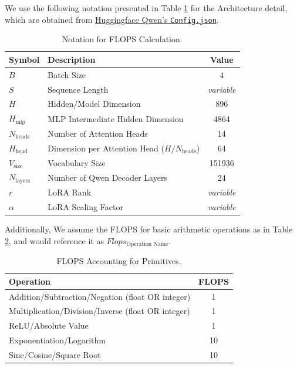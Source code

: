 \documentclass{article}
\begin{document}
We use the following notation presented in Table \ref{tab:notation} for the Architecture detail, which are obtained from \href{https://huggingface.co/Qwen/Qwen2.5-0.5B-Instruct/blob/main/config.json}{Huggingface Qwen's \texttt{Config.json}}.

\begin{table}[!ht]
\renewcommand{\arraystretch}{1.3}
\centering
\setlength{\tabcolsep}{8pt}
\begin{tabular}{llc} 
    \toprule
    \textbf{Symbol} & \textbf{Description} & \textbf{Value} \\
    \midrule
    $B$           & Batch Size & 4 \\ 
    $S$           & Sequence Length & \textit{variable} \\ 
    $H$           & Hidden/Model Dimension & 896 \\
    $H_{\text{mlp}}$ & MLP Intermediate Hidden Dimension & 4864 \\
    $N_{\text{heads}}$ & Number of Attention Heads & 14 \\
    $H_{\text{head}}$ & Dimension per Attention Head ($H / N_{\text{heads}}$) & 64 \\ 
    $V_{\text{size}}$ & Vocabulary Size & 151936 \\
    $N_{\text{layers}}$ & Number of Qwen Decoder Layers & 24 \\ %
    $r$           & LoRA Rank & \textit{variable} \\ %
    $\alpha$      & LoRA Scaling Factor & \textit{variable} \\ %
    \bottomrule
\end{tabular}
\caption{Notation for FLOPS Calculation.} 
\label{tab:notation} 
\end{table}
Additionally, We assume the FLOPS for basic arithmetic operations as in Table \ref{tab:primitive_flops}, and would reference it as $Flops_{\text{Operation Name}}$.

\begin{table}[!ht] %
\renewcommand{\arraystretch}{1.4}
\centering
\setlength{\tabcolsep}{8pt} %
\begin{tabular}{lc}
    \toprule
    \textbf{Operation}                                 & \textbf{FLOPS} \\
    \midrule
    Addition/Subtraction/Negation (float OR integer) & 1              \\
    Multiplication/Division/Inverse (float OR integer) & 1              \\
    ReLU/Absolute Value                                & 1              \\
    Exponentiation/Logarithm                           & 10             \\
    Sine/Cosine/Square Root                            & 10             \\
    \bottomrule
\end{tabular}
\caption{FLOPS Accounting for Primitives.} %
\label{tab:primitive_flops}
\end{table}
\end{document}
